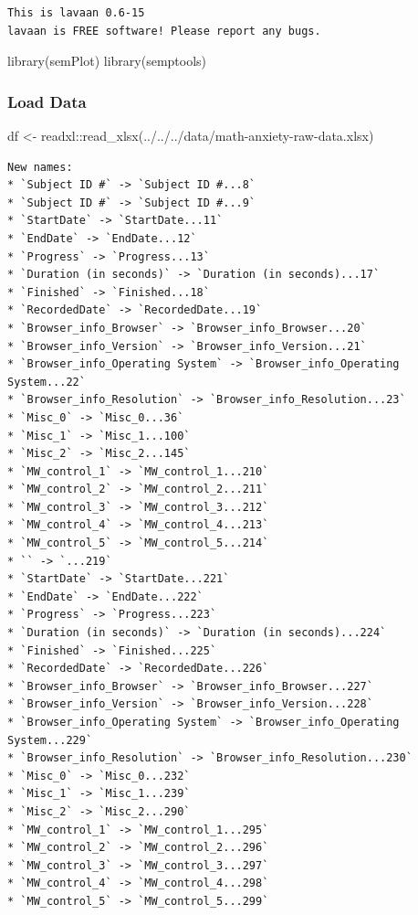 \documentclass[
  letterpaper,
  DIV=11,
  numbers=noendperiod]{scrartcl}
\newenvironment{Shaded}{\begin{snugshade}}{\end{snugshade}}
\newcommand{\FunctionTok}[1]{\textcolor[rgb]{0.02,0.16,0.49}{#1}}
\newcommand{\NormalTok}[1]{\textcolor[rgb]{0.00,0.44,0.13}{#1}}
\newcommand{\OtherTok}[1]{\textcolor[rgb]{0.00,0.44,0.13}{#1}}
\newcommand{\SpecialCharTok}[1]{\textcolor[rgb]{0.25,0.44,0.63}{#1}}
\newcommand{\StringTok}[1]{\textcolor[rgb]{0.25,0.44,0.63}{#1}}
\begin{document}
\begin{verbatim}
This is lavaan 0.6-15
lavaan is FREE software! Please report any bugs.
\end{verbatim}

\begin{Shaded}
\begin{Highlighting}[]
\FunctionTok{library}\NormalTok{(semPlot)}
\FunctionTok{library}\NormalTok{(semptools)}
\end{Highlighting}
\end{Shaded}

\hypertarget{load-data}{%
\subsubsection{Load Data}\label{load-data}}

\begin{Shaded}
\begin{Highlighting}[]
\NormalTok{df }\OtherTok{\textless{}{-}}\NormalTok{ readxl}\SpecialCharTok{::}\FunctionTok{read\_xlsx}\NormalTok{(}\StringTok{\textquotesingle{}../../../data/math{-}anxiety{-}raw{-}data.xlsx\textquotesingle{}}\NormalTok{)}
\end{Highlighting}
\end{Shaded}

\begin{verbatim}
New names:
* `Subject ID #` -> `Subject ID #...8`
* `Subject ID #` -> `Subject ID #...9`
* `StartDate` -> `StartDate...11`
* `EndDate` -> `EndDate...12`
* `Progress` -> `Progress...13`
* `Duration (in seconds)` -> `Duration (in seconds)...17`
* `Finished` -> `Finished...18`
* `RecordedDate` -> `RecordedDate...19`
* `Browser_info_Browser` -> `Browser_info_Browser...20`
* `Browser_info_Version` -> `Browser_info_Version...21`
* `Browser_info_Operating System` -> `Browser_info_Operating System...22`
* `Browser_info_Resolution` -> `Browser_info_Resolution...23`
* `Misc_0` -> `Misc_0...36`
* `Misc_1` -> `Misc_1...100`
* `Misc_2` -> `Misc_2...145`
* `MW_control_1` -> `MW_control_1...210`
* `MW_control_2` -> `MW_control_2...211`
* `MW_control_3` -> `MW_control_3...212`
* `MW_control_4` -> `MW_control_4...213`
* `MW_control_5` -> `MW_control_5...214`
* `` -> `...219`
* `StartDate` -> `StartDate...221`
* `EndDate` -> `EndDate...222`
* `Progress` -> `Progress...223`
* `Duration (in seconds)` -> `Duration (in seconds)...224`
* `Finished` -> `Finished...225`
* `RecordedDate` -> `RecordedDate...226`
* `Browser_info_Browser` -> `Browser_info_Browser...227`
* `Browser_info_Version` -> `Browser_info_Version...228`
* `Browser_info_Operating System` -> `Browser_info_Operating System...229`
* `Browser_info_Resolution` -> `Browser_info_Resolution...230`
* `Misc_0` -> `Misc_0...232`
* `Misc_1` -> `Misc_1...239`
* `Misc_2` -> `Misc_2...290`
* `MW_control_1` -> `MW_control_1...295`
* `MW_control_2` -> `MW_control_2...296`
* `MW_control_3` -> `MW_control_3...297`
* `MW_control_4` -> `MW_control_4...298`
* `MW_control_5` -> `MW_control_5...299`
\end{verbatim}
\end{document}
